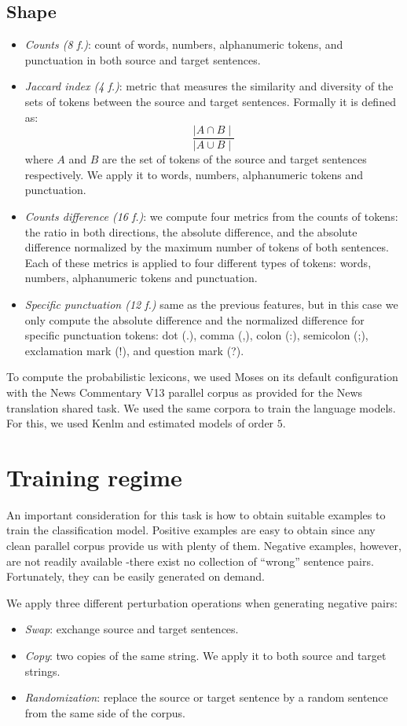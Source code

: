 \documentclass[a0]{sciposter}
\begin{document}
\begin{multicols*}{2}
\subsection{Shape}
\begin{itemize}
  \item \textit{Counts (8 f.)}: count of words, numbers, alphanumeric tokens, and punctuation in both source and target sentences.
  \item \textit{Jaccard index (4 f.)}: metric that measures the similarity and diversity of the sets of tokens between the source and target sentences. Formally it is defined as:
  $$ \frac{\mid A\cap B\mid}{\mid A\cup B\mid}$$
  where $A$ and $B$ are the set of tokens of the source and target sentences respectively. We apply it to words, numbers, alphanumeric tokens and punctuation.
  \item \textit{Counts difference (16 f.)}: we compute four metrics from the counts of tokens: the ratio in both directions, the absolute difference, and the absolute difference normalized by the maximum number of tokens of both sentences. Each of these metrics is applied to four different types of tokens: words, numbers, alphanumeric tokens and punctuation.
  \item \textit{Specific punctuation (12 f.)} same as the previous features, but in this case we only compute the absolute difference and the normalized difference for specific punctuation tokens: dot (.), comma (,), colon (:), semicolon (;), exclamation mark (!), and question mark (?).
\end{itemize}

To compute the probabilistic lexicons, we used Moses on its default configuration with the News Commentary V13 parallel corpus as provided for the News translation shared task. We used the same corpora to train the language models. For this, we used Kenlm and estimated models of order $5$.

\section{Training regime}
An important consideration for this task is how to obtain suitable examples to train the classification model. Positive examples are easy to obtain since any clean parallel corpus provide us with plenty of them. Negative examples, however, are not readily available -there exist no collection of ``wrong'' sentence pairs. Fortunately, they can be easily generated on demand. 

We apply three different perturbation operations when generating negative pairs:
\begin{itemize}
  \item \textit{Swap}: exchange source and target sentences.
  \item \textit{Copy}: two copies of the same string. We apply it to both source and target strings.
  \item \textit{Randomization}: replace the source or target sentence by a random sentence from the same side of the corpus.
\end{itemize}


\end{multicols*}
\end{document}
